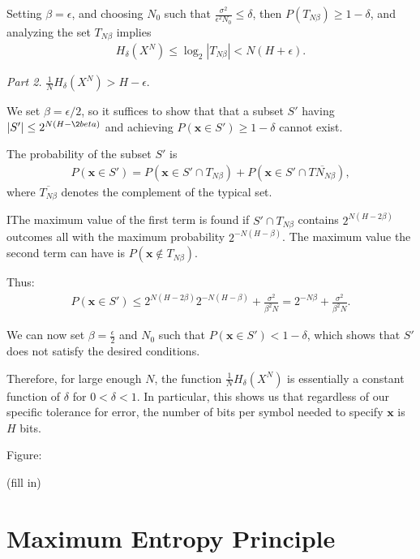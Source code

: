 \documentclass[12pt]{extarticle}
\newcommand{\eps}{\epsilon}
\newcommand{\mbf}{\mathbf}
\newcommand{\ol}{\overline}
\begin{document}
  Setting $\beta = \eps$, and choosing $N_0$ such that $\frac{\sigma^2}{\eps^2 N_0} \leq \delta$, then $P(T_{N \beta}) \geq 1 - \delta$, and analyzing the set $T_{N \beta}$ implies
  \begin{align*}
    H_{\delta}(X^N) \leq \log_2 |T_{N \beta}| < N (H + \eps).
  \end{align*}

  {\it Part 2.} $\frac{1}{N} H_{\delta}(X^N) > H - \epsilon$.

  We set $\beta = \eps / 2$, so it suffices to show that that a subset $S'$ having $|S'| \leq 2^{N (H - \2beta)}$ and achieving $P(\mbf{x} \in S') \geq 1 - \delta$ cannot exist.

  The probability of the subset $S'$ is
  \begin{align*}
    P(\mbf{x} \in S') = P(\mbf{x} \in S' \cap T_{N \beta}) + P(\mbf{x} \in S' \cap \ol{TN_{N \beta}}),
  \end{align*}
  where $\ol{T_{N \beta}}$ denotes the complement of the typical set.

  IThe maximum value of the first term is found if $S' \cap T_{N \beta}$ contains $2^{N(H - 2 \beta)}$ outcomes all with the maximum probability $2^{-N (H - \beta)}$.  The maximum value the second term can have is $P(\mbf{x} \not \in T_{N \beta})$.

  Thus:
  \begin{align*}
    P(\mbf{x} \in S') \leq 2^{N (H - 2 \beta)} 2^{-N (H - \beta)} + \frac{\sigma^2}{\beta^2 N} = 2^{-N \beta} + \frac{\sigma^2}{\beta^2 N}.
  \end{align*}

  We can now set $\beta = \frac{\eps}{2}$ and $N_0$ such that $P(\mbf{x} \in S') < 1 - \delta$, which shows that $S'$ does not satisfy the desired conditions.

  Therefore, for large enough $N$, the function $\frac{1}{N} H_{\delta} (X^N)$ is essentially a constant function of $\delta$ for $0 < \delta < 1$. In particular, this shows us that regardless of our specific tolerance for error, the number of bits per symbol needed to specify $\mbf{x}$ is $H$ bits.

  Figure:

  (fill in)



  \section{Maximum Entropy Principle}
\end{document}

